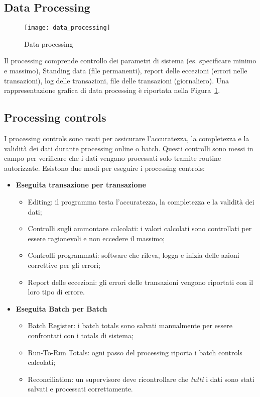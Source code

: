 \subsection{Data Processing}

\begin{figure}[h!]
        \begin{center}
                \texttt{[image: data\_processing]}
        \end{center}
        \caption{Data processing}
        \label{fig:data:processing}
\end{figure}

Il processing comprende controllo dei parametri di sistema (es. specificare
minimo e massimo), Standing data (file permanenti), report delle eccezioni
(errori nelle transazioni), log delle transazioni, file delle transazioni
(giornaliero). Una rappresentazione grafica di data processing è riportata
nella Figura~\ref{fig:data:processing}.

\subsection{Processing controls}
I processing controls sono usati per assicurare
l'accuratezza, la completezza e la validità dei dati durante
processing online o batch. Questi controlli sono messi in campo
per verificare che i dati vengano processati solo tramite routine
autorizzate. Esistono due modi per eseguire i processing controls:

\begin{itemize}
\item \textbf{Eseguita transazione per transazione}
\begin{itemize}
\item Editing: il programma testa l'accuratezza, la completezza
e la validità dei dati;
\item Controlli sugli ammontare calcolati: i valori calcolati
sono controllati per essere ragionevoli e non eccedere il massimo;
\item Controlli programmati: software che rileva, logga e inizia
delle azioni correttive per gli errori;
\item Report delle eccezioni: gli errori delle transazioni vengono
riportati con il loro tipo di errore.
\end{itemize}

\item \textbf{Eseguita Batch per Batch}

\begin{itemize}
\item Batch Register: i batch totals sono salvati manualmente per essere
confrontati con i totals di sistema;
\item Run-To-Run Totals: ogni passo del processing riporta i batch
controls calcolati;
\item Reconciliation: un supervisore deve ricontrollare che \emph{tutti}
i dati sono stati salvati e processati correttamente.
\end{itemize}
\end{itemize}


